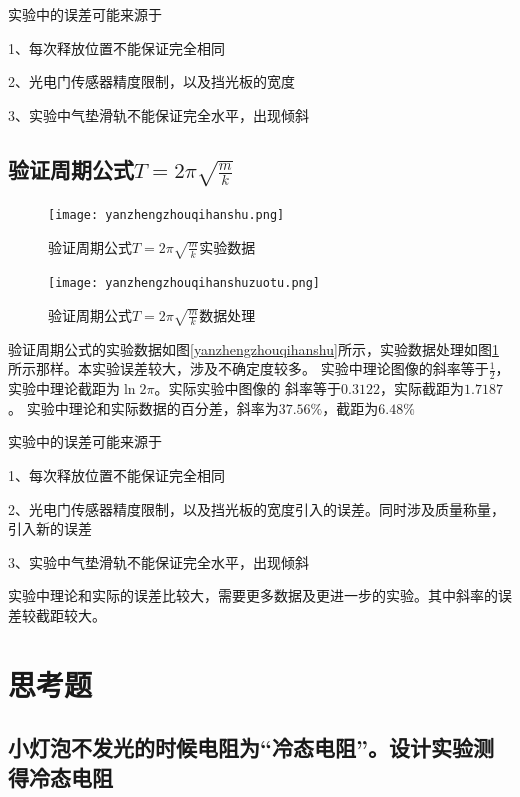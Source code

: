 \documentclass{ctexart}
\begin{document}
  实验中的误差可能来源于
  
  1、每次释放位置不能保证完全相同

  2、光电门传感器精度限制，以及挡光板的宽度

  3、实验中气垫滑轨不能保证完全水平，出现倾斜

  \subsection{验证周期公式$T=2\pi \sqrt{\frac{m}{k}}$}
  \begin{figure}[b]
    \centering
    \begin{minipage}[b]{0.48\textwidth}
      \centering
      \texttt{[image: yanzhengzhouqihanshu.png]}
      \caption{验证周期公式$T=2\pi \sqrt{\frac{m}{k}}$实验数据}\label{yanzhengzhouqihanshu}
    \end{minipage}
    \begin{minipage}[b]{0.48\textwidth}
      \centering
      \texttt{[image: yanzhengzhouqihanshuzuotu.png]}
      \caption{验证周期公式$T=2\pi \sqrt{\frac{m}{k}}$数据处理}\label{yanzhengzhouqigongshizuotu}
    \end{minipage}
  \end{figure}
  验证周期公式的实验数据如图\ref{yanzhengzhouqihanshu}所示，实验数据处理如图\ref{yanzhengzhouqigongshizuotu}
  所示那样。本实验误差较大，涉及不确定度较多。
  实验中理论图像的斜率等于$\frac{1}{2}$，实验中理论截距为$\ln{2\pi}$。实际实验中图像的
  斜率等于$0.3122$，实际截距为$1.7187$。
  实验中理论和实际数据的百分差，斜率为$37.56\%$，截距为$6.48\%$

  实验中的误差可能来源于 
  
  1、每次释放位置不能保证完全相同

  2、光电门传感器精度限制，以及挡光板的宽度引入的误差。同时涉及质量称量，引入新的误差

  3、实验中气垫滑轨不能保证完全水平，出现倾斜

  实验中理论和实际的误差比较大，需要更多数据及更进一步的实验。其中斜率的误差较截距较大。
\newpage

\section{思考题}
  \subsection{小灯泡不发光的时候电阻为“冷态电阻”。设计实验测得冷态电阻}
\end{document}

